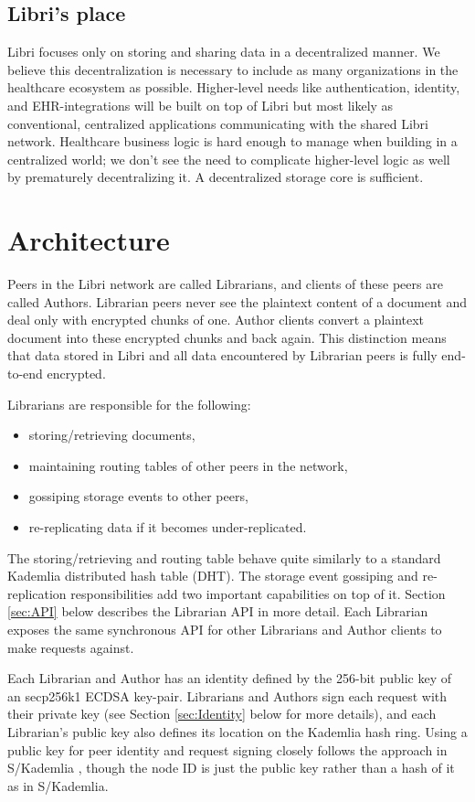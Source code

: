 \documentclass[10pt]{article}
\begin{document}
\subsection{Libri's place}
Libri focuses only on storing and sharing data in a decentralized manner. We believe this decentralization is necessary to include as many organizations in the healthcare ecosystem as possible. Higher-level needs like authentication, identity, and EHR-integrations will be built on top of Libri but most likely as conventional, centralized applications communicating with the shared Libri network. Healthcare business logic is hard enough to manage when building in a centralized world; we don't see the need to complicate higher-level logic as well by prematurely decentralizing it. A decentralized storage core is sufficient.


\section{Architecture}
\label{sec:arch}
Peers in the Libri network are called Librarians, and clients of these peers are called Authors. Librarian peers never see the plaintext content of a document and deal only with encrypted chunks of one. Author clients convert a plaintext document into these encrypted chunks and back again. This distinction means that data stored in Libri and all data encountered by Librarian peers is fully end-to-end encrypted.

Librarians are responsible for the following:
\begin{itemize}
	\item storing/retrieving documents,
	\item maintaining routing tables of other peers in the network,
	\item gossiping storage events to other peers,
	\item re-replicating data if it becomes under-replicated.
\end{itemize}
The storing/retrieving and routing table behave quite similarly to a standard Kademlia \cite{kademlia} distributed hash table (DHT). The storage event gossiping and re-replication responsibilities add two important capabilities on top of it. Section \ref{sec:API} below describes the Librarian API in more detail. Each Librarian exposes the same synchronous API for other Librarians and Author clients to make requests against.

Each Librarian and Author has an identity defined by the 256-bit public key of an secp256k1 ECDSA key-pair. Librarians and Authors sign each request with their private key (see Section \ref{sec:Identity} below for more details), and each Librarian's public key also defines its location on the Kademlia hash ring. Using a public key for peer identity and request signing closely follows the approach in S/Kademlia \cite{skademlia}, though the node ID is just the public key rather than a hash of it as in S/Kademlia. 
\end{document}
